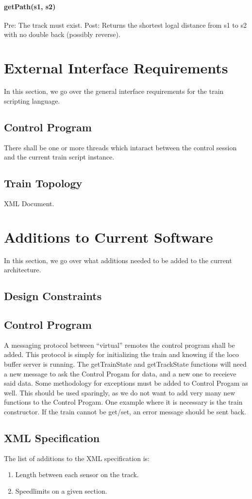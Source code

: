 \documentclass[a4paper,11pt,notitlepage]{article}
\def\CS{Control Progam\xspace}
\begin{document}
\paragraph{getPath(s1, s2)} Pre: The track must exist.  Post: Returns the shortest logal distance from s1 to s2 with no double back (possibly reverse).

\newpage
\section{External Interface Requirements}
    In this section, we go over the general interface requirements for the train scripting language.
\subsection{Control Program}
    There shall be one or more threads which intaract between the control session and the current train script instance.
\subsection{Train Topology}
	XML Document.

\newpage
\section{Additions to Current Software}
    In this section, we go over what additions needed to be added to the current architecture.
\subsection{Design Constraints}
\subsection{Control Program}
    A messaging protocol between ``virtual'' remotes the control program shall be added.  This protocol is simply for initializing the train and knowing if the loco buffer server is running. The getTrainState and getTrackState functions will need a new message to ask the \CS for data, and a new one to receieve said data.
	Some methodology for exceptions must be added to \CS as well. This should be used sparingly, as we do not want to add very many new functions to the \CS. One example where it is necessary is the train constructor. If the train cannot be get/set, an error message should be sent back.
\subsection{XML Specification}
    The list of additions to the XML specification is:
\begin{enumerate}
    \item Length between each sensor on the track.
    \item Speedlimits on a given section.
\end{enumerate}
\end{document}
